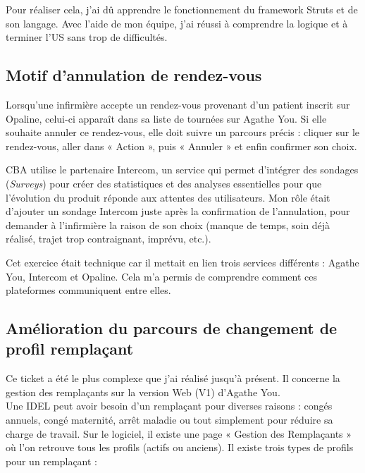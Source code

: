 \documentclass{article}
\begin{document}
Pour réaliser cela, j'ai dû apprendre le fonctionnement du framework Struts et de son langage. Avec l'aide de mon équipe, j'ai réussi à comprendre la logique et à terminer l'US sans trop de difficultés.


\newpage

\subsection{Motif d'annulation de rendez-vous}

Lorsqu'une infirmière accepte un rendez-vous provenant d'un patient inscrit sur Opaline, celui-ci apparaît dans sa liste de tournées sur Agathe You. Si elle souhaite annuler ce rendez-vous, elle doit suivre un parcours précis : cliquer sur le rendez-vous, aller dans « Action », puis « Annuler » et enfin confirmer son choix.

CBA utilise le partenaire Intercom, un service qui permet d'intégrer des sondages (\textit{Surveys}) pour créer des statistiques et des analyses essentielles pour que l'évolution du produit réponde aux attentes des utilisateurs. Mon rôle était d'ajouter un sondage Intercom juste après la confirmation de l'annulation, pour demander à l'infirmière la raison de son choix (manque de temps, soin déjà réalisé, trajet trop contraignant, imprévu, etc.).

Cet exercice était technique car il mettait en lien trois services différents : Agathe You, Intercom et Opaline. Cela m'a permis de comprendre comment ces plateformes communiquent entre elles.

\subsection{Amélioration du parcours de changement de profil remplaçant}

Ce ticket a été le plus complexe que j'ai réalisé jusqu'à présent. Il concerne la gestion des remplaçants sur la version Web (V1) d'Agathe You.\\

Une IDEL peut avoir besoin d'un remplaçant pour diverses raisons : congés annuels, congé maternité, arrêt maladie ou tout simplement pour réduire sa charge de travail. Sur le logiciel, il existe une page « Gestion des Remplaçants » où l'on retrouve tous les profils (actifs ou anciens). Il existe trois types de profils pour un remplaçant :
\end{document}
